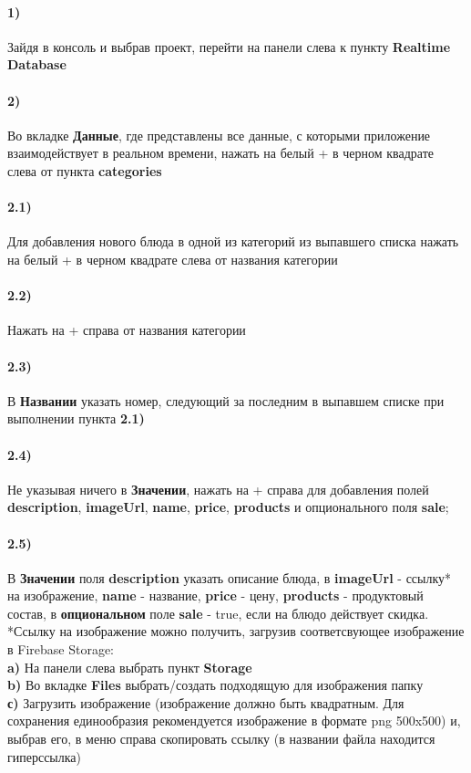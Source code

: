 \documentclass{article}
\begin{document}
  \paragraph{1)}
   {
        Зайдя в консоль и выбрав проект, перейти на панели слева к пункту \textbf{Realtime Database}
   }
  \paragraph{2)}
   {
        Во вкладке \textbf{Данные}, где представлены все данные, с которыми приложение взаимодействует в реальном времени, нажать на белый + в черном квадрате слева от пункта \textbf{categories}
   }
  \paragraph{2.1)}
   {
        Для добавления нового блюда в одной из категорий из выпавшего списка нажать на белый + в черном квадрате слева от названия категории
        }
   \paragraph{2.2)}
   {
       Нажать на + справа от названия категории
   }

   \paragraph{2.3)}
   {
        В \textbf{Названии} указать номер, следующий за последним в выпавшем списке при выполнении пункта \textbf{2.1)}
   }

   \paragraph{2.4)}
   {
        Не указывая ничего в \textbf{Значении}, нажать на + справа для добавления полей \textbf{description}, \textbf{imageUrl}, \textbf{name}, \textbf{price}, \textbf{products} и опционального поля \textbf{sale};
   }
   \paragraph{2.5)}
   {
  В \textbf{Значении} поля \textbf{description} указать описание блюда, в \textbf{imageUrl} - ссылку* на изображение, \textbf{name} - название, \textbf{price} - цену, \textbf{products} - продуктовый состав, в \textbf{опциональном} поле \textbf{sale} - true, если на блюдо действует скидка.
  \\ *Ссылку на изображение можно получить, загрузив соответсвующее изображение в Firebase Storage:
  \\ \quad \textbf{a)} {На панели слева выбрать пункт \textbf{Storage}}
  \\ \quad \textbf{b)} {Во вкладке \textbf{Files} выбрать/создать подходящую для изображения папку}
  \\ \quad \textbf{с)} {Загрузить изображение (изображение должно быть квадратным. Для сохранения единообразия рекомендуется изображение в формате png 500x500) и, выбрав его, в меню справа скопировать ссылку (в названии файла находится гиперссылка)}
   }
\end{document}

